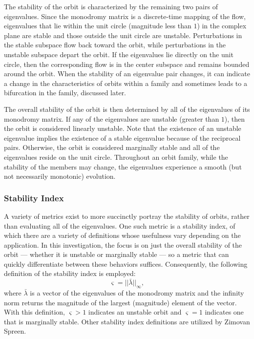 The stability of the orbit is characterized by the remaining two pairs of eigenvalues. Since the
monodromy matrix is a discrete-time mapping of the flow, eigenvalues that lie within the unit
circle (magnitude less than $1$) in the complex plane are stable and those outside the unit circle
are unstable. Perturbations in the stable subspace flow back toward the orbit, while perturbations
in the unstable subspace depart the orbit. If the eigenvalues lie directly on the unit circle, then
the corresponding flow is in the center subspace and remains bounded around the orbit. When the
stability of an eigenvalue pair changes, it can indicate a change in the characteristics of orbits
within a family and sometimes leads to a bifurcation in the family, discussed later.

The overall stability of the orbit is then determined by all of the eigenvalues of its monodromy
matrix. If any of the eigenvalues are unstable (greater than $1$), then the orbit is considered
linearly unstable. Note that the existence of an unstable eigenvalue implies the existence of a
stable eigenvalue because of the reciprocal pairs. Otherwise, the orbit is considered marginally
stable and all of the eigenvalues reside on the unit circle. Throughout an orbit family, while the
stability of the members may change, the eigenvalues experience a smooth (but not necessarily
monotonic) evolution.

\subsubsection{Stability Index}
A variety of metrics exist to more succinctly portray the stability of orbits, rather than
evaluating all of the eigenvalues. One such metric is a stability index, of which there are a
variety of definitions whose usefulness vary depending on the application. In this investigation,
the focus is on just the overall stability of the orbit --- whether it is unstable or marginally
stable --- so a metric that can quickly differentiate between these behaviors suffices.
Consequently, the following definition of the stability index is employed:
\begin{equation}
    \varsigma=||\bar{\lambda}||_{\infty},
    \label{eq:stabilityindex}
\end{equation}
where $\bar{\lambda}$ is a vector of the eigenvalues of the monodromy matrix and the infinity norm
returns the magnitude of the largest (magnitude) element of the vector\cite{Power:2019}. With this
definition, $\varsigma>1$ indicates an unstable orbit and $\varsigma=1$ indicates one that is
marginally stable. Other stability index definitions are utilized by Zimovan
Spreen\cite{ZimovanSpreen:2021}.

